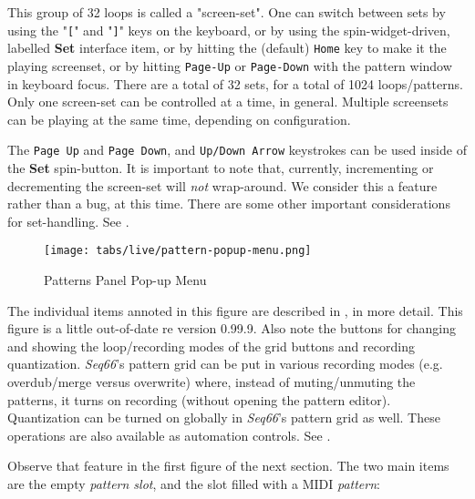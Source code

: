   This group of 32 loops is called a "screen-set".
   One can switch between sets by using the
   \index{keys![}
   "\texttt{[}" and
   \index{keys!]}
   "\texttt{]}" keys on the keyboard, or by using
   the spin-widget-driven, labelled \textbf{Set} interface item, or
   by hitting the (default) \texttt{Home} key to make it the playing screenset,
   or by hitting \texttt{Page-Up} or \texttt{Page-Down} with the pattern window
   in keyboard focus.
   There are a total of 32 sets, for a total of 1024 loops/patterns. 
   Only one screen-set can be controlled at a time, in general.
   Multiple screensets can be playing at the same time, depending on
   configuration.

   The \texttt{Page Up} and \texttt{Page Down}, and \texttt{Up/Down Arrow}
   keystrokes can be used inside of the \textbf{Set} spin-button.
   It is important to note that, currently, incrementing or decrementing
   the screen-set will \textsl{not} wrap-around.
   We consider this a feature rather than a bug, at this time.
   There are some other important considerations for set-handling.
   See .

\begin{figure}[H]
   \centering 
   \texttt{[image: tabs/live/pattern-popup-menu.png]}
   \caption{Patterns Panel Pop-up Menu}
   \label{fig:patterns_panel_popup_menu}
\end{figure}

   The individual items annoted in this figure are described in
   , in more detail.
   This figure is a little out-of-date re version 0.99.9.
   Also note the buttons for changing and showing the
   loop/recording modes of the grid buttons and recording quantization.
   \textsl{Seq66}'s pattern grid can be put in various recording
   modes (e.g. overdub/merge versus overwrite) where, instead of
   muting/unmuting the patterns, it turns on recording (without opening the
   pattern editor).
   Quantization can be turned on globally in \textsl{Seq66}'s pattern grid
   as well.
   These operations are also available as automation controls.
   See .

   Observe that feature in the first figure of the next section.
   The two main items are the empty \textsl{pattern slot}, and the slot filled
   with a MIDI \textsl{pattern}:


